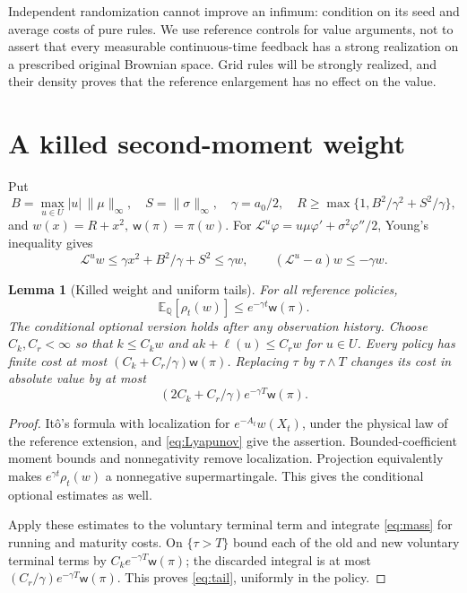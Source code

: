 \documentclass[11pt,a4paper]{article}
\newtheorem{lemma}[theorem]{Lemma}
\theoremstyle{definition}
\theoremstyle{remark}
\newcommand{\E}{\mathbb E}
\newcommand{\Qq}{\mathbb Q}
\newcommand{\wt}{\mathsf w}
\begin{document}
Independent randomization cannot improve an infimum: condition on its
seed and average costs of pure rules. We use reference controls for
value arguments, not to assert that every measurable continuous-time
feedback has a strong realization on a prescribed original Brownian
space. Grid rules will be strongly realized, and their density proves
that the reference enlargement has no effect on the value.

\section{A killed second-moment weight}

Put
\[
 B=\max_{u\in U}|u|\,\|\mu\|_\infty,\quad S=\|\sigma\|_\infty,\quad
 \gamma=a_0/2,\quad R\geq\max\{1,B^2/\gamma^2+S^2/\gamma\},
\]
and \(w(x)=R+x^2,\ \wt(\pi)=\pi(w)\). For
\(\mathcal L^u\varphi=u\mu\varphi'+\sigma^2\varphi''/2\),
Young's inequality gives
\begin{equation}\label{eq:Lyapunov}
 \mathcal L^u w\leq\gamma x^2+B^2/\gamma+S^2\leq\gamma w,
 \qquad(\mathcal L^u-a)w\leq-\gamma w.
\end{equation}

\begin{lemma}[Killed weight and uniform tails]\label{lem:weight}
For all reference policies,
\begin{equation}\label{eq:mass}
 \E_\Qq[\rho_t(w)]\leq e^{-\gamma t}\wt(\pi).
\end{equation}
The conditional optional version holds after any observation history.
Choose \(C_k,C_r<\infty\) so that \(k\leq C_kw\) and
\(ak+\ell(u)\leq C_rw\) for \(u\in U\).
Every policy has finite cost at most
\((C_k+C_r/\gamma)\wt(\pi)\). Replacing \(\tau\) by \(\tau\wedge T\)
changes its cost in absolute value by at most
\begin{equation}\label{eq:tail}
 (2C_k+C_r/\gamma)e^{-\gamma T}\wt(\pi).
\end{equation}
\end{lemma}
\begin{proof}
Itô's formula with localization for \(e^{-A_t}w(X_t)\), under the
physical law of the reference extension, and \eqref{eq:Lyapunov}
give the assertion. Bounded-coefficient moment bounds and
nonnegativity remove localization. Projection equivalently makes
\(e^{\gamma t}\rho_t(w)\) a nonnegative supermartingale. This gives
the conditional optional estimates as well.

Apply these estimates to the voluntary terminal term and integrate
\eqref{eq:mass} for running and maturity costs. On \(\{\tau>T\}\)
bound each of the old and new voluntary terminal terms by
\(C_ke^{-\gamma T}\wt(\pi)\); the discarded integral is at most
\((C_r/\gamma)e^{-\gamma T}\wt(\pi)\). This proves \eqref{eq:tail},
uniformly in the policy.
\end{proof}
\end{document}
